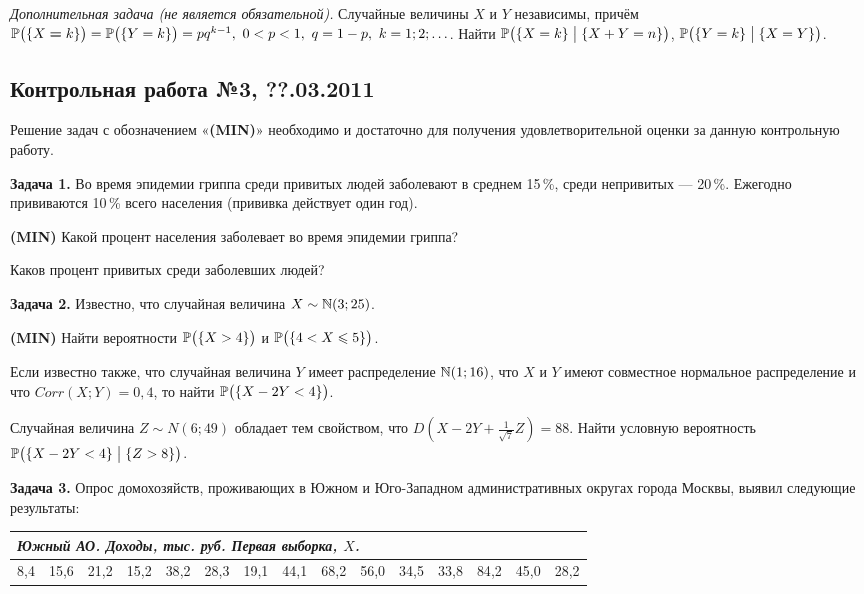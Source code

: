 \documentclass[12pt, a4paper]{article}\usepackage[]{graphicx}\usepackage[]{color}
\newenvironment{enumerate*}{
\begin{enumerate}
  \setlength{\itemsep}{0pt}
  \setlength{\parskip}{0pt}
  \setlength{\parsep}{0pt}
}{\end{enumerate}}
\newcommand{\MIN}{\textbf{(MIN)}{}}
\begin{document}
\emph{Дополнительная задача (не является обязательной).} Случайные величины $X$ и $Y$ независимы, причём $\P\bigl(\{X\hm=k\}\bigr)=\P\bigl(\{Y=k\}\bigr)=pq^{k-1},\ 0<p<1,\ q=1-p,\ k=1;2;\ldots$. Найти $\P\bigl(\{X=k\} \bigm| \{X+Y=n\}\bigr)$, $\P\bigl(\{Y=k\}\bigm| \{X=Y\}\bigr)$.

\subsection{Контрольная работа №3, ??.03.2011}

Решение задач с обозначением «\MIN{}» необходимо и достаточно для получения удовлетворительной оценки за данную контрольную работу.\par\smallskip

\textbf{Задача 1.} Во время эпидемии гриппа среди привитых людей заболевают в среднем 15\,\%, среди непривитых — 20\,\%. Ежегодно прививаются 10\,\% всего населения (прививка действует один год).
\begin{enumerate*}
\item \MIN{} Какой процент населения заболевает во время эпидемии гриппа?
\item Каков процент привитых среди заболевших людей?
\end{enumerate*}

\textbf{Задача 2.} Известно, что случайная величина $X\sim\N(3;25)$.
\begin{enumerate*}
\item \MIN{} Найти вероятности $\P\bigl(\{X>4\}\bigr)$ и $\P\bigl(\{4<X\leqslant 5\}\bigr)$.
\item Если известно также, что случайная величина $Y$ имеет распределение $\N(1;16)$, что $X$ и $Y$ имеют совместное нормальное распределение и что $Corr(X;Y)=0{,}4$, то найти $\P\bigl(\{X-2Y<4\}\bigr)$.
\item Случайная величина $Z\sim N(6;49)$ обладает тем свойством, что $D\left(X-2Y+\frac{1}{\sqrt{7}}Z\right)=88$. Найти условную вероятность $\P\bigl(\{X-2Y<4\} \bigm| \{Z>8\}\bigr)$.
\end{enumerate*}

\textbf{Задача 3.} Опрос домохозяйств, проживающих в Южном и Юго-Западном административных округах города Москвы, выявил следующие результаты:
\par\smallskip
\begin{tabular}{|p{6mm}|p{6mm}|p{6mm}|p{6mm}|p{6mm}|p{6mm}|p{6mm}|p{6mm}|p{6mm}|p{6mm}|p{6mm}|p{6mm}|p{6mm}|p{6mm}|p{6mm}|}
\multicolumn{15}{l}{\emph{Южный АО. Доходы, тыс. руб. Первая выборка, $X$.}}\\ \hline
8{,}4 & 15{,}6 & 21{,}2 & 15{,}2 & 38{,}2 & 28{,}3 & 19{,}1 & 44{,}1 & 68{,}2 & 56{,}0 & 34{,}5 & 33{,}8 & 84{,}2 & 45{,}0 & 28{,}2 \\ \hline
\end{tabular}\par\smallskip
\end{document}
